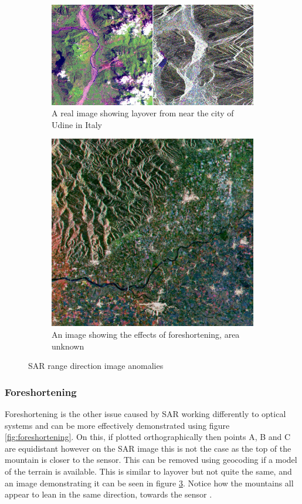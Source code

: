 \begin{figure}
	\centering
	\begin{subfigure}{.5\textwidth}
		\centering
		\includegraphics[width=0.9\linewidth]{../figures/esa_layover_real}
		\caption{A real image showing layover from near the city of Udine in Italy}
		\label{fig:layover_real}
	\end{subfigure}%
	\begin{subfigure}{.5\textwidth}
		\centering
		\includegraphics[width=0.9\linewidth]{../figures/esa_foreshortening_real}	
		\caption{An image showing the effects of foreshortening, area unknown}
		\label{fig:foreshortening_real}
	\end{subfigure}
	\caption{SAR range direction image anomalies \cite{ForeshorteningLayover}}
\end{figure}


\subsubsection{Foreshortening}
Foreshortening is the other issue caused by SAR working differently to optical systems and can be more effectively demonstrated using figure \ref{fig:foreshortening}. On this, if plotted orthographically then points A, B and C are equidistant however on the SAR image this is not the case as the top of the mountain is closer to the sensor. This can be removed using geocoding if a model of the terrain is available. This is similar to layover but not quite the same, and an image demonstrating it can be seen in figure \ref{fig:foreshortening_real}. Notice how the mountains all appear to lean in the same direction, towards the sensor \cite{ForeshorteningLayover}.

